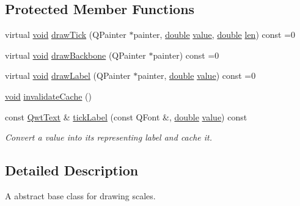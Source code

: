 \subsection*{Protected Member Functions}
\begin{DoxyCompactItemize}
\item 
virtual \hyperlink{group___u_a_v_objects_plugin_ga444cf2ff3f0ecbe028adce838d373f5c}{void} \hyperlink{class_qwt_abstract_scale_draw_a31791e80bf07d23adbe500740aac5a58}{draw\-Tick} (Q\-Painter $\ast$painter, \hyperlink{_super_l_u_support_8h_a8956b2b9f49bf918deed98379d159ca7}{double} \hyperlink{glext_8h_aa0e2e9cea7f208d28acda0480144beb0}{value}, \hyperlink{_super_l_u_support_8h_a8956b2b9f49bf918deed98379d159ca7}{double} \hyperlink{glext_8h_ac759c9f8b2506530e65879e566e59f02}{len}) const =0
\item 
virtual \hyperlink{group___u_a_v_objects_plugin_ga444cf2ff3f0ecbe028adce838d373f5c}{void} \hyperlink{class_qwt_abstract_scale_draw_a15994a6033e689c3acdb8d83ae4f2a1c}{draw\-Backbone} (Q\-Painter $\ast$painter) const =0
\item 
virtual \hyperlink{group___u_a_v_objects_plugin_ga444cf2ff3f0ecbe028adce838d373f5c}{void} \hyperlink{class_qwt_abstract_scale_draw_aa78dc8bf05a0224450c947af54128d8d}{draw\-Label} (Q\-Painter $\ast$painter, \hyperlink{_super_l_u_support_8h_a8956b2b9f49bf918deed98379d159ca7}{double} \hyperlink{glext_8h_aa0e2e9cea7f208d28acda0480144beb0}{value}) const =0
\item 
\hyperlink{group___u_a_v_objects_plugin_ga444cf2ff3f0ecbe028adce838d373f5c}{void} \hyperlink{class_qwt_abstract_scale_draw_a4ed95cd23c5d779c1b05aa5295409aa6}{invalidate\-Cache} ()
\item 
const \hyperlink{class_qwt_text}{Qwt\-Text} \& \hyperlink{class_qwt_abstract_scale_draw_a5e703dcb115a51024f89f92e61c2c8d8}{tick\-Label} (const Q\-Font \&, \hyperlink{_super_l_u_support_8h_a8956b2b9f49bf918deed98379d159ca7}{double} \hyperlink{glext_8h_aa0e2e9cea7f208d28acda0480144beb0}{value}) const 
\begin{DoxyCompactList}\small\item\em Convert a value into its representing label and cache it. \end{DoxyCompactList}\end{DoxyCompactItemize}


\subsection{Detailed Description}
A abstract base class for drawing scales. 

